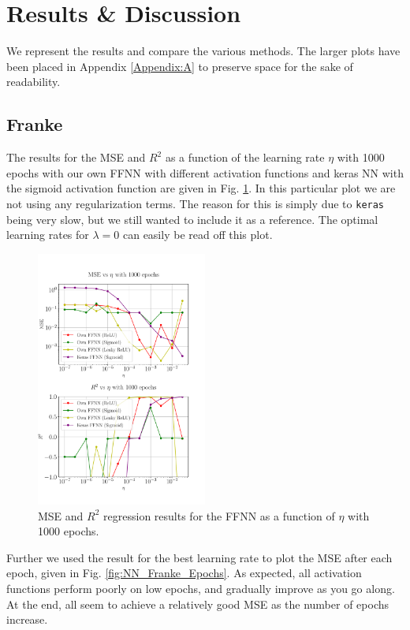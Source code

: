 \documentclass[%
reprint,
amsmath,amssymb,
aps,
]{revtex4-2}
\begin{document}
\section{Results \& Discussion}
We represent the results and compare the various methods. The larger plots have been placed in Appendix \ref{Appendix:A} to preserve space for the sake of readability.

\subsection{Franke}
The results for the MSE and $R^2$ as a function of the learning rate $\eta$ with 1000 epochs with our own FFNN with different activation functions and keras NN with the sigmoid activation function are given in Fig. \ref{fig:NN_Franke_LR_1000}. In this particular plot we are not using any regularization terms. The reason for this is simply due to \texttt{keras} being very slow, but we still wanted to include it as a reference. The optimal learning rates for $\lambda=0$ can easily be read off this plot.
\begin{figure}[ht!]
	\includegraphics[width=0.5\textwidth]{Python/Figures/NN_MSE_R2_Franke_LearningRate_Epochs1000.pdf}
	\caption{MSE and $R^2$ regression results for the FFNN as a function of $\eta$ with 1000 epochs.}
	\label{fig:NN_Franke_LR_1000}
\end{figure}

Further we used the result for the best learning rate to plot the MSE after each epoch, given in Fig. \ref{fig:NN_Franke_Epochs}. As expected, all activation functions perform poorly on low epochs, and gradually improve as you go along. At the end, all seem to achieve a relatively good MSE as the number of epochs increase.
\end{document}
